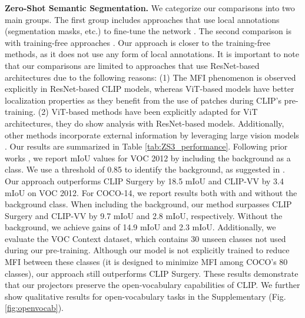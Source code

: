 \textbf{Zero-Shot Semantic Segmentation.}
We categorize our comparisons into two main groups. The first group includes approaches that use local annotations (segmentation masks, etc.) to fine-tune the network \cite{SPNet, ZS3Net, CLIP-ES}. The second comparison is with training-free approaches \cite{clip, clip_surgery}. Our approach is closer to the training-free methods, as it does not use any form of local annotations. It is important to note that our comparisons are limited to approaches that use ResNet-based architectures due to the following reasons: (1) The MFI phenomenon is observed explicitly in ResNet-based CLIP models, whereas ViT-based models have better localization properties as they benefit from the use of patches during CLIP's pre-training. (2) ViT-based methods \cite{gem_walid,clip_surgery} have been explicitly adapted for ViT architectures, they do show analysis with ResNet-based models. Additionally, other methods incorporate external information by leveraging large vision models \cite{proxyclip,samclip,CLIP-dino}. Our results are summarized in Table \ref{tab:ZS3_performance}. Following prior works \cite{SPNet, ZS3Net, CLIP-ES, clip_surgery}, we report mIoU values for VOC 2012 by including the background as a class. We use a threshold of 0.85 to identify the background, as suggested in \cite{gem_walid}. Our approach outperforms CLIP Surgery by 18.5 mIoU and CLIP-VV by 3.4 mIoU on VOC 2012. For COCO-14, we report results both with and without the background class. When including the background, our method surpasses CLIP Surgery and CLIP-VV by 9.7 mIoU and 2.8 mIoU, respectively. Without the background, we achieve gains of 14.9 mIoU and 2.3 mIoU. Additionally, we evaluate the VOC Context dataset, which contains 30 unseen classes not used during our pre-training. Although our model is not explicitly trained to reduce MFI between these classes (it is designed to minimize MFI among COCO’s 80 classes), our approach still outperforms CLIP Surgery. These results demonstrate that our projectors preserve the open-vocabulary capabilities of CLIP. We further show qualitative results for open-vocabulary tasks in the Supplementary (Fig. \ref{fig:openvocab}).



